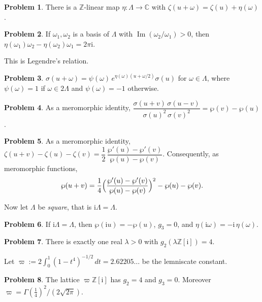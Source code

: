 \documentclass[reqno]{amsart}
\theoremstyle{definition}
\newtheorem{problem}{Problem}[section]
\theoremstyle{plain}
\newcommand{\Z}{\mathbb{Z}}
\newcommand{\C}{\mathbb{C}}
\newcommand{\ii}{\mathrm{i}}
\begin{document}
\begin{problem}\label{pr:eta}
There is a \(\Z\)-linear map \(\eta \colon \Lambda \to \C\) with \(\zeta(u + \omega) = \zeta(u) + \eta(\omega)\).
\end{problem}

\begin{problem}\label{pr:legendre}
If \(\omega_1, \omega_2\) is a basis of \(\Lambda\) with \(\operatorname{Im}(\omega_2/\omega_1) > 0\), then \(\eta(\omega_1)\omega_2 - \eta(\omega_2)\omega_1 = 2\pi\ii\).
\end{problem}

This is Legendre's relation.

\begin{problem}\label{pr:sigma-qp}
\(\sigma(u + \omega) = \psi(\omega)\, e^{\eta(\omega)(u + \omega/2)} \sigma(u)\) for \(\omega \in \Lambda\), where \(\psi(\omega) = 1\) if \(\omega \in 2\Lambda\) and \(\psi(\omega) = -1\) otherwise.
\end{problem}

\begin{problem}\label{pr:sigma-add}
As a meromorphic identity, \(\dfrac{\sigma(u+v)\,\sigma(u-v)}{\sigma(u)^2\,\sigma(v)^2} = \wp(v) - \wp(u)\).
\end{problem}

\begin{problem}\label{pr:zeta-add}
As a meromorphic identity, \(\zeta(u+v) - \zeta(u) - \zeta(v) = \dfrac12 \, \dfrac{\wp'(u) - \wp'(v)}{\wp(u) - \wp(v)}\).  Consequently, as meromorphic functions,
\[
  \wp(u+v) = \frac14 \Bigl( \frac{\wp'(u) - \wp'(v)}{\wp(u) - \wp(v)} \Bigr)^2 - \wp(u) - \wp(v) .
\]
\end{problem}

Now let \(\Lambda\) be \emph{square}, that is \(\ii\Lambda = \Lambda\).

\begin{problem}\label{pr:square}
If \(\ii\Lambda = \Lambda\), then \(\wp(\ii u) = -\wp(u)\), \(g_3 = 0\), and \(\eta(\ii\omega) = -\ii\,\eta(\omega)\).
\end{problem}

\begin{problem}\label{pr:square-g2}
There is exactly one real \(\lambda > 0\) with \(g_2(\lambda\Z[\ii]) = 4\).
\end{problem}

Let \(\varpi := 2 \int_0^1 (1 - t^4)^{-1/2}\, d t = 2.62205\ldots\) be the lemniscate constant.

\begin{problem}\label{pr:varpi}
The lattice \(\varpi\Z[\ii]\) has \(g_2 = 4\) and \(g_3 = 0\).  Moreover \(\varpi = \Gamma(\tfrac14)^2 / (2\sqrt{2\pi})\).
\end{problem}
\end{document}
